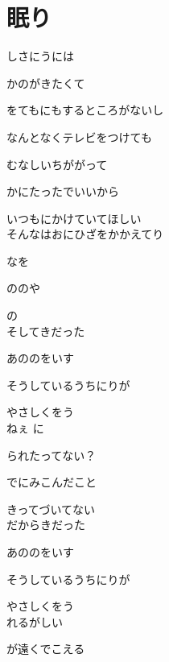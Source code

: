 \section{ 眠り}
\large{

しさにうには

かのがきたくて

をてもにもするところがないし

なんとなくテレビをつけても

むなしいちががって

かにたったでいいから

いつもにかけていてほしい
\\

そんなはおにひざをかかえてり

なを

ののや

の
\\

そしてきだった

あののをいす

そうしているうちにりが

やさしくをう
\\

ねぇ に

られたってない？

でにみこんだこと

きってづいてない
\\

だからきだった

あののをいす

そうしているうちにりが

やさしくをう
\\

れるがしい

が遠くでこえる

}